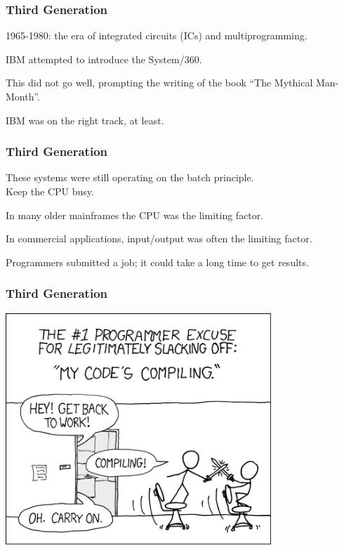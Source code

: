 \begin{frame}
\frametitle{Third Generation}
1965-1980: the era of integrated circuits (ICs) and multiprogramming.

IBM attempted to introduce the System/360.

This did not go well, prompting the writing of the book ``The Mythical Man-Month''.

IBM was on the right track, at least.

\end{frame}

\begin{frame}
\frametitle{Third Generation}

These systems were still operating on the batch principle.\\
\quad Keep the CPU busy. 

In many older mainframes the CPU was the limiting factor. 

In commercial applications, input/output was often the limiting factor. 

Programmers submitted a job; it could take a long time to get results. 

\end{frame}

\begin{frame}
\frametitle{Third Generation}

\begin{center}
\includegraphics[width=0.75\textwidth]{images/compiling.png}
\end{center}

\end{frame}

